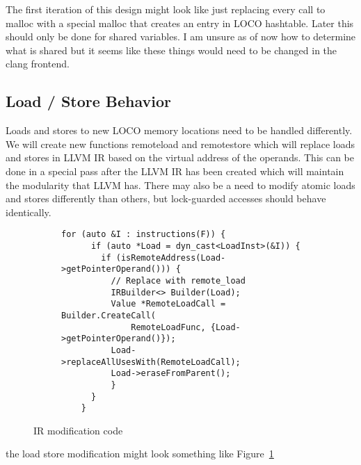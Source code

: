 \documentclass[sigplan,nonacm]{acmart}
\begin{document}
The first iteration of this design might look like just replacing every call to malloc 
with a special malloc that creates an entry in LOCO hashtable. Later this should only 
be done for shared variables. I am unsure as of now how to determine what is shared
but it seems like these things would need to be changed in the clang frontend.

\subsection{Load / Store Behavior}
Loads and stores to new LOCO memory locations need to be handled differently. 
We will create new functions remoteload and remotestore which will replace
loads and stores in LLVM IR based on the virtual address of the operands.
This can be done in a special pass after the LLVM IR has been created which will maintain the 
modularity that LLVM has. There may also be a need to modify atomic loads and stores 
differently than others, but lock-guarded accesses should behave identically.

\begin{figure}
    \centering
    \begin{subfigure}{0.45\textwidth}
    \begin{lstlisting}[basicstyle={\ttfamily\scriptsize}]
    for (auto &I : instructions(F)) {
      if (auto *Load = dyn_cast<LoadInst>(&I)) {
        if (isRemoteAddress(Load->getPointerOperand())) {
          // Replace with remote_load
          IRBuilder<> Builder(Load);
          Value *RemoteLoadCall = Builder.CreateCall(
              RemoteLoadFunc, {Load->getPointerOperand()});
          Load->replaceAllUsesWith(RemoteLoadCall);
          Load->eraseFromParent();
          }
      }
    }
    \end{lstlisting}
    \end{subfigure}
    \caption{IR modification code}
    \label{fig:ir-modification}
    \end{figure}

the load store modification might look something like Figure~\ref{fig:ir-modification}

\end{document}
